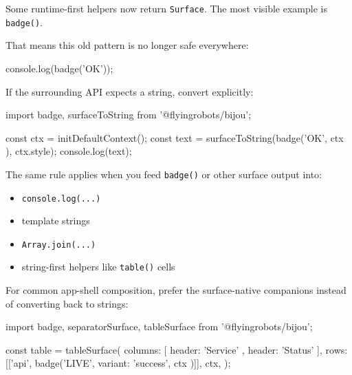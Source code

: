 Some runtime-first helpers now return \texttt{S\allowbreak{}u\allowbreak{}r\allowbreak{}f\allowbreak{}a\allowbreak{}c\allowbreak{}e}. The most visible example is \texttt{b\allowbreak{}a\allowbreak{}d\allowbreak{}g\allowbreak{}e\allowbreak{}(\allowbreak{})}.

That means this old pattern is no longer safe everywhere:

\begin{CodeBlock}
console.log(badge('OK'));
\end{CodeBlock}

If the surrounding API expects a string, convert explicitly:

\begin{CodeBlock}
import { badge, surfaceToString } from '@flyingrobots/bijou';

const ctx = initDefaultContext();
const text = surfaceToString(badge('OK', { ctx }), ctx.style);
console.log(text);
\end{CodeBlock}

The same rule applies when you feed \texttt{b\allowbreak{}a\allowbreak{}d\allowbreak{}g\allowbreak{}e\allowbreak{}(\allowbreak{})} or other surface output into:

\begin{itemize}
\tightlist
\item
  \texttt{c\allowbreak{}o\allowbreak{}n\allowbreak{}s\allowbreak{}o\allowbreak{}l\allowbreak{}e\allowbreak{}.\allowbreak{}l\allowbreak{}o\allowbreak{}g\allowbreak{}(\allowbreak{}.\allowbreak{}.\allowbreak{}.\allowbreak{})}
\item
  template strings
\item
  \texttt{A\allowbreak{}r\allowbreak{}r\allowbreak{}a\allowbreak{}y\allowbreak{}.\allowbreak{}j\allowbreak{}o\allowbreak{}i\allowbreak{}n\allowbreak{}(\allowbreak{}.\allowbreak{}.\allowbreak{}.\allowbreak{})}
\item
  string-first helpers like \texttt{t\allowbreak{}a\allowbreak{}b\allowbreak{}l\allowbreak{}e\allowbreak{}(\allowbreak{})} cells
\end{itemize}

For common app-shell composition, prefer the surface-native companions instead of converting back to strings:

\begin{CodeBlock}
import { badge, separatorSurface, tableSurface } from '@flyingrobots/bijou';

const table = tableSurface({
  columns: [{ header: 'Service' }, { header: 'Status' }],
  rows: [['api', badge('LIVE', { variant: 'success', ctx })]],
  ctx,
});
\end{CodeBlock}

